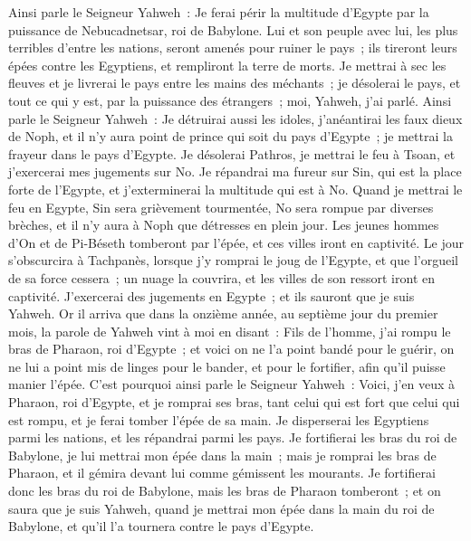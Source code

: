 \begin{multicols}{2}
Ainsi parle le Seigneur Yahweh~: Je ferai périr la multitude d'Egypte par la puissance de Nebucadnetsar, roi de Babylone.
Lui et son peuple avec lui, les plus terribles d'entre les nations, seront amenés pour ruiner le pays~; ils tireront leurs épées contre les Egyptiens, et rempliront la terre de morts.
Je mettrai à sec les fleuves et je livrerai le pays entre les mains des méchants~; je désolerai le pays, et tout ce qui y est, par la puissance des étrangers~; moi, Yahweh, j'ai parlé.
Ainsi parle le Seigneur Yahweh~: Je détruirai aussi les idoles, j'anéantirai les faux dieux de Noph, et il n'y aura point de prince qui soit du pays d'Egypte~; je mettrai la frayeur dans le pays d'Egypte.
Je désolerai Pathros, je mettrai le feu à Tsoan, et j'exercerai mes jugements sur No.
Je répandrai ma fureur sur Sin, qui est la place forte de l'Egypte, et j'exterminerai la multitude qui est à No.
Quand je mettrai le feu en Egypte, Sin sera grièvement tourmentée, No sera rompue par diverses brèches, et il n'y aura à Noph que détresses en plein jour.
Les jeunes hommes d'On et de Pi-Béseth tomberont par l'épée, et ces villes iront en captivité.
Le jour s'obscurcira à Tachpanès, lorsque j'y romprai le joug de l'Egypte, et que l'orgueil de sa force cessera~; un nuage la couvrira, et les villes de son ressort iront en captivité.
J'exercerai des jugements en Egypte~; et ils sauront que je suis Yahweh.
Or il arriva que dans la onzième année, au septième jour du premier mois, la parole de Yahweh vint à moi en disant~:
Fils de l'homme, j'ai rompu le bras de Pharaon, roi d'Egypte~; et voici on ne l'a point bandé pour le guérir, on ne lui a point mis de linges pour le bander, et pour le fortifier, afin qu'il puisse manier l'épée.
C'est pourquoi ainsi parle le Seigneur Yahweh~: Voici, j'en veux à Pharaon, roi d'Egypte, et je romprai ses bras, tant celui qui est fort que celui qui est rompu, et je ferai tomber l'épée de sa main.
Je disperserai les Egyptiens parmi les nations, et les répandrai parmi les pays.
Je fortifierai les bras du roi de Babylone, je lui mettrai mon épée dans la main~; mais je romprai les bras de Pharaon, et il gémira devant lui comme gémissent les mourants.
Je fortifierai donc les bras du roi de Babylone, mais les bras de Pharaon tomberont~; et on saura que je suis Yahweh, quand je mettrai mon épée dans la main du roi de Babylone, et qu'il l'a tournera contre le pays d'Egypte.

\end{multicols}
